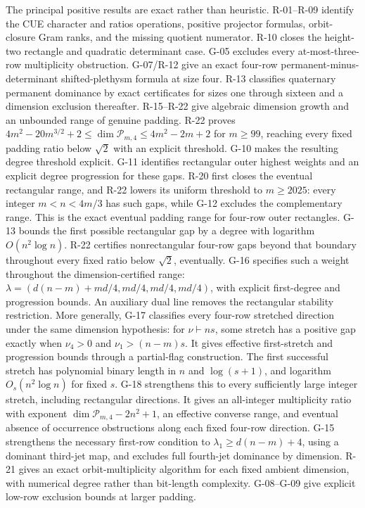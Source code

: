 The principal positive results are exact rather than heuristic. R-01--R-09 identify the CUE character and ratios operations, positive projector formulas, orbit-closure Gram ranks, and the missing quotient numerator. R-10 closes the height-two rectangle and quadratic determinant case. G-05 excludes every at-most-three-row multiplicity obstruction. G-07/R-12 give an exact four-row permanent-minus-determinant shifted-plethysm formula at size four. R-13 classifies quaternary permanent dominance by exact certificates for sizes one through sixteen and a dimension exclusion thereafter. R-15--R-22 give algebraic dimension growth and an unbounded range of genuine padding. R-22 proves $4m^2-20m^{3/2}+2\leq\dim\mathcal P_{m,4}\leq4m^2-2m+2$ for $m\geq99$, reaching every fixed padding ratio below $\sqrt2$ with an explicit threshold. G-10 makes the resulting degree threshold explicit. G-11 identifies rectangular outer highest weights and an explicit degree progression for these gaps. R-20 first closes the eventual rectangular range, and R-22 lowers its uniform threshold to $m\geq2025$: every integer $m<n<4m/3$ has such gaps, while G-12 excludes the complementary range. This is the exact eventual padding range for four-row outer rectangles. G-13 bounds the first possible rectangular gap by a degree with logarithm $O(n^2\log n)$. R-22 certifies nonrectangular four-row gaps beyond that boundary throughout every fixed ratio below $\sqrt2$, eventually. G-16 specifies such a weight throughout the dimension-certified range: $\lambda=(d(n-m)+md/4,md/4,md/4,md/4)$, with explicit first-degree and progression bounds. An auxiliary dual line removes the rectangular stability restriction. More generally, G-17 classifies every four-row stretched direction under the same dimension hypothesis: for $\nu\vdash ns$, some stretch has a positive gap exactly when $\nu_4>0$ and $\nu_1>(n-m)s$. It gives effective first-stretch and progression bounds through a partial-flag construction. The first successful stretch has polynomial binary length in $n$ and $\log(s+1)$, and logarithm $O_s(n^2\log n)$ for fixed $s$. G-18 strengthens this to every sufficiently large integer stretch, including rectangular directions. It gives an all-integer multiplicity ratio with exponent $\dim\mathcal P_{m,4}-2n^2+1$, an effective converse range, and eventual absence of occurrence obstructions along each fixed four-row direction. G-15 strengthens the necessary first-row condition to $\lambda_1\geq d(n-m)+4$, using a dominant third-jet map, and excludes full fourth-jet dominance by dimension. R-21 gives an exact orbit-multiplicity algorithm for each fixed ambient dimension, with numerical degree rather than bit-length complexity. G-08--G-09 give explicit low-row exclusion bounds at larger padding.

